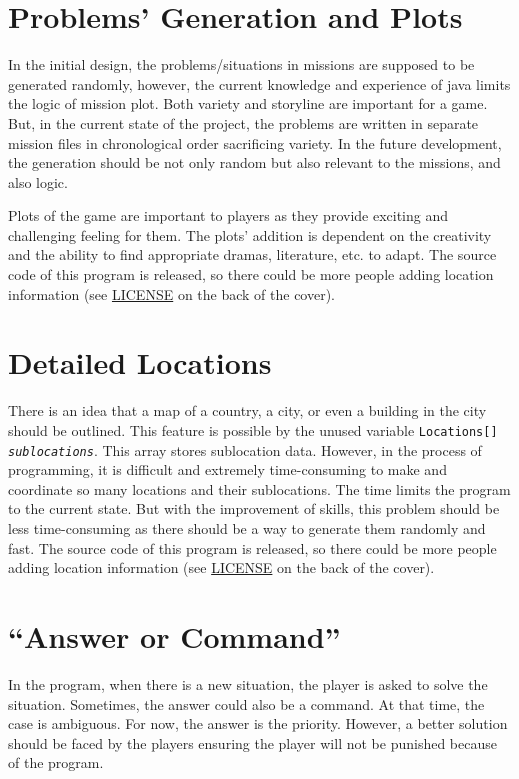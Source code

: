 \documentclass[letterpaper, 12pt]{report}
\begin{document}
\section{Problems' Generation and Plots}
In the initial design, the problems/situations in missions are supposed to be generated randomly, however, the current knowledge and experience of java limits the logic of mission plot. Both variety and storyline are important for a game. But, in the current state of the project, the problems are written in separate mission files in chronological order sacrificing variety. In the future development, the generation should be not only random but also relevant to the missions, and also logic.

Plots of the game are important to players as they provide exciting and challenging feeling for them. The plots' addition is dependent on the creativity and the ability to find appropriate dramas, literature, etc. to adapt. The source code of this program is released, so there could be more people adding location information (see \hyperref[chap:LICENSE]{LICENSE} on the back of the cover).

\section{Detailed Locations}
There is an idea that a map of a country, a city, or even a building in the city should be outlined. This feature is possible by the unused variable \texttt{Locations[] \textit{sublocations}}. This array stores sublocation data. However, in the process of programming, it is difficult and extremely time-consuming to make and coordinate so many locations and their sublocations. The time limits the program to the current state. But with the improvement of skills, this problem should be less time-consuming as there should be a way to generate them randomly and fast. The source code of this program is released, so there could be more people adding location information (see \hyperref[chap:LICENSE]{LICENSE} on the back of the cover).

\section{``Answer or Command'' }
In the program, when there is a new situation, the player is asked to solve the situation. Sometimes, the answer could also be a command. At that time, the case is ambiguous. For now, the answer is the priority. However, a better solution should be faced by the players ensuring the player will not be punished because of the program.
\end{document}
